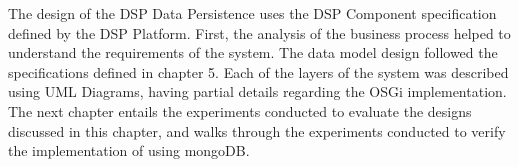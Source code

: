 The design of the DSP Data Persistence uses the DSP Component specification
defined by the DSP Platform. First, the analysis of the business process
helped to understand the requirements of the system. The data model design
followed the specifications defined in chapter 5. Each of the layers of the
system was described using UML Diagrams, having partial details regarding the
OSGi implementation. The next chapter entails the experiments conducted to
evaluate the designs discussed in this chapter, and walks through the
experiments conducted to verify the implementation of using mongoDB.
